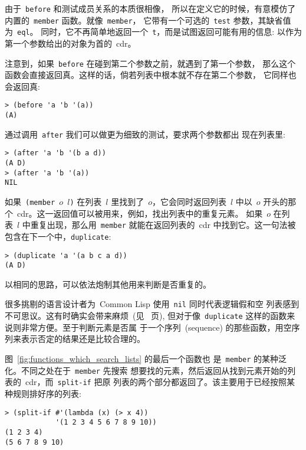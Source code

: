 由于~\texttt{before} 和测试成员关系的本质很相像，
所以在定义它的时候，有意模仿了内置的~\texttt{member} 函数。就像~\texttt{member}，
它带有一个可选的~\texttt{test} 参数，其缺省值为~\texttt{eql}。
同时，它不再简单地返回一个~\texttt{t}，而是试图返回可能有用的信息:
以作为第一个参数给出的对象为首的~cdr。

注意到，如果~\texttt{before} 在碰到第二个参数之前，就遇到了第一个参数，
那么这个函数会直接返回真。这样的话，倘若列表中根本就不存在第二个参数，
它同样也会返回真:
\begin{lstlisting}
> (before 'a 'b '(a))
(A)
\end{lstlisting}

通过调用~\texttt{after} 我们可以做更为细致的测试，要求两个参数都出
现在列表里:
\begin{lstlisting}
> (after 'a 'b '(b a d))
(A D)
> (after 'a 'b '(a))
NIL
\end{lstlisting}

如果~\texttt{(member $o$ $l$)} 在列表~$l$ 里找到了~$o$，它会同时返回列表~$l$
中以~$o$ 开头的那个~cdr。这一返回值可以被用来，例如，找出列表中的重复元素。
如果~$o$ 在列表~$l$ 中重复出现，那么用~\texttt{member} 就能在返回列表的~cdr
中找到它。这一句法被包含在下一个\utility{}中，\texttt{duplicate}:
\begin{lstlisting}
> (duplicate 'a '(a b c a d))
(A D)
\end{lstlisting}
以相同的思路，可以依法炮制其他用来判断是否重复的\utility{}。

很多挑剔的语言设计者为~Common Lisp 使用~\texttt{nil} 同时代表逻辑假和空
列表感到不可思议。这有时确实会带来麻烦~(见~\pageref{sec:failure} 页),
但对于像~\texttt{duplicate} 这样的函数来说则非常方便。至于判断元素是否属
于一个序列~(sequence) 的那些函数，用空序列来表示否定的结果还是比较合理的。

图~\ref{fig:functions_which_search_lists} 的最后一个函数也
是~\texttt{member} 的某种泛化。不同之处在于~\texttt{member} 先搜索
想要找的元素，然后返回从找到元素开始的列表的~cdr，而~\texttt{split-if} 把原
列表的两个部分都返回了。该\utility{}主要用于已经按照某种规则排好序的列表:
\begin{lstlisting}
> (split-if #'(lambda (x) (> x 4))
            '(1 2 3 4 5 6 7 8 9 10))
(1 2 3 4)
(5 6 7 8 9 10)
\end{lstlisting}

